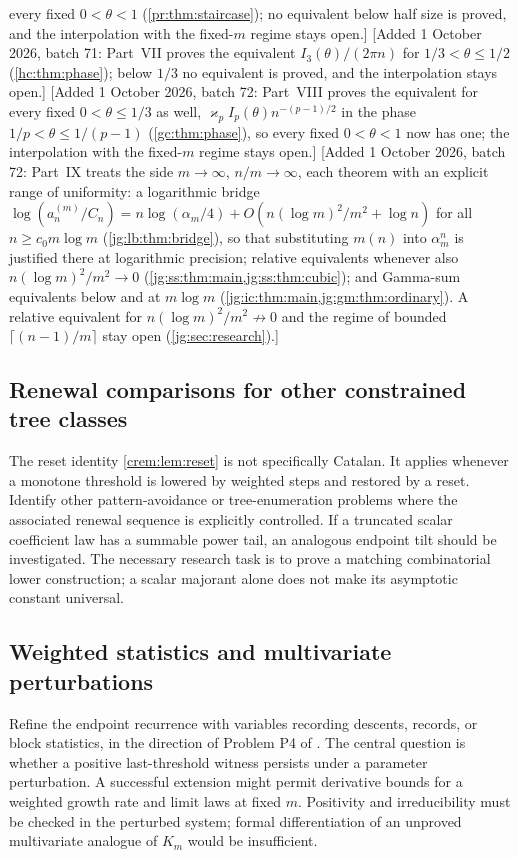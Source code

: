\documentclass[11pt,a4paper]{article}
\theoremstyle{definition}\newaliascnt{definition}{theorem}
\theoremstyle{remark}\newaliascnt{remark}{theorem}
\begin{document}
every fixed $0<\theta<1$ (\cref{pr:thm:staircase}); no equivalent below half
size is proved, and the interpolation with the fixed-$m$ regime stays open.]
[Added 1 October 2026, batch 71: Part~VII proves the equivalent
$I_3(\theta)/(2\pi n)$ for $1/3<\theta\le1/2$ (\cref{hc:thm:phase}); below
$1/3$ no equivalent is proved, and the interpolation stays open.]
[Added 1 October 2026, batch 72: Part~VIII proves the equivalent for every
fixed $0<\theta\le1/3$ as well, $\varkappa_pI_p(\theta)n^{-(p-1)/2}$ in the
phase $1/p<\theta\le1/(p-1)$ (\cref{gc:thm:phase}), so every fixed
$0<\theta<1$ now has one; the interpolation with the fixed-$m$ regime stays
open.]
[Added 1 October 2026, batch 72: Part~IX treats the side $m\to\infty$,
$n/m\to\infty$, each theorem with an explicit range of uniformity: a
logarithmic bridge $\log(a_n^{(m)}/C_n)=n\log(\alpha_m/4)+O(n(\log m)^2/m^2+\log n)$
for all $n\ge c_0m\log m$ (\cref{jg:lb:thm:bridge}), so that substituting
$m(n)$ into $\alpha_m^n$ is justified there at logarithmic precision; relative
equivalents whenever also $n(\log m)^2/m^2\to0$
(\cref{jg:ss:thm:main,jg:ss:thm:cubic}); and Gamma-sum equivalents below and
at $m\log m$ (\cref{jg:ic:thm:main,jg:gm:thm:ordinary}). A relative
equivalent for $n(\log m)^2/m^2\not\to0$ and the regime of bounded
$\lceil(n-1)/m\rceil$ stay open (\cref{jg:sec:research}).]

\subsection{Renewal comparisons for other constrained tree classes}
The reset identity \cref{crem:lem:reset} is not specifically Catalan. It
applies whenever a monotone threshold is lowered by weighted steps and
restored by a reset. Identify other pattern-avoidance or tree-enumeration
problems where the associated renewal sequence is explicitly controlled. If
a truncated scalar coefficient law has a summable power tail, an analogous
endpoint tilt should be investigated. The necessary research task is to
prove a matching combinatorial lower construction; a scalar majorant alone
does not make its asymptotic constant universal.

\subsection{Weighted statistics and multivariate perturbations}
Refine the endpoint recurrence with variables recording descents, records,
or block statistics, in the direction of Problem P4 of \cite{MayamaAkita}.
The central question is whether a positive last-threshold witness persists
under a parameter perturbation. A successful extension might permit
derivative bounds for a weighted growth rate and limit laws at fixed $m$.
Positivity and irreducibility must be checked in the perturbed system;
formal differentiation of an unproved multivariate analogue of $K_m$ would
be insufficient.
\end{document}
